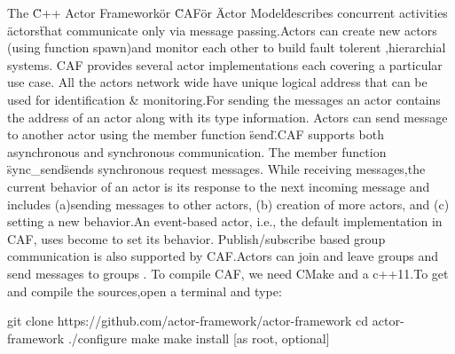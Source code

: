The \"C++ Actor Framework\" or \"CAF\" or \"Actor Model\" describes concurrent activities \"actors\" that communicate only via message passing.Actors can create new actors (using function spawn)and monitor each other to build fault tolerent ,hierarchial systems.
CAF provides several actor implementations each covering a particular use case. All the actors network wide have unique logical address that can be used for identification & monitoring.For sending the messages an actor contains the address of an actor along with its type information.
Actors can send message to another actor using the member function \"send\".CAF supports both asynchronous and synchronous communication. The member function \"sync_send\" sends synchronous request messages.
While receiving messages,the current behavior of an actor is its response to the next incoming message and includes (a)sending messages to other actors, (b) creation of more actors, and (c) setting a new behavior.An event-based actor, i.e., the default implementation in CAF, uses become to set its behavior.
Publish/subscribe based group communication is also supported by CAF.Actors can join and leave groups and send messages to groups .
To compile CAF, we need CMake and a c++11.To get and compile the sources,open a terminal and type:

git clone https://github.com/actor-framework/actor-framework
cd actor-framework
./configure
make
make install [as root, optional]
